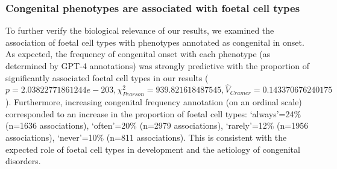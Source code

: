 \documentclass[
]{article}
\begin{document}
\subsubsection{Congenital phenotypes are associated with foetal cell
types}\label{congenital-phenotypes-are-associated-with-foetal-cell-types}

To further verify the biological relevance of our results, we examined
the association of foetal cell types with phenotypes annotated as
congenital in onset. As expected, the frequency of congenital onset with
each phenotype (as determined by GPT-4 annotations) was strongly
predictive with the proportion of significantly associated foetal cell
types in our results
(\(p=2.03822771861244e-203,\chi^2_{Pearson}=939.821618487545,\hat{V}_{Cramer}=0.143370676240175\)).
Furthermore, increasing congenital frequency annotation (on an ordinal
scale) corresponded to an increase in the proportion of foetal cell
types: `always'=24\% (n=1636 associations), `often'=20\% (n=2979
associations), `rarely'=12\% (n=1956 associations), `never'=10\% (n=811
associations). This is consistent with the expected role of foetal cell
types in development and the aetiology of congenital disorders.
\end{document}
